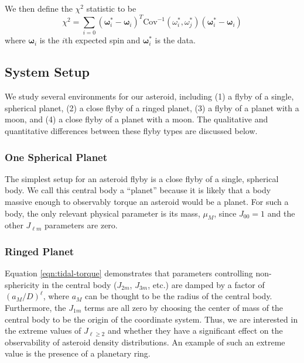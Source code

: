 \documentclass[11pt]{article}
\begin{document}
We then define the $\chi^2$ statistic to be
\begin{equation}
\chi^2 = \sum_{i=0} (\bm \omega_i^* - \bm \omega_i)^T\text{Cov}^{-1}(\omega^*_i, \omega^*_j)(\bm \omega_i^* - \bm \omega_i)
\end{equation}
where $\bm \omega_i$ is the $i$th expected spin and $\bm \omega_i^*$ is the data.



\subsection{System Setup}
We study several environments for our asteroid, including (1) a flyby of a single, spherical planet, (2) a close flyby of a ringed planet, (3) a flyby of a planet with a moon, and (4) a close flyby of a planet with a moon. The qualitative and quantitative differences between these flyby types are discussed below.

\subsubsection{One Spherical Planet}
The simplest setup for an asteroid flyby is a close flyby of a single, spherical body. We call this central body a ``planet'' because it is likely that a body massive enough to observably torque an asteroid would be a planet. For such a body, the only relevant physical parameter is its mass, $\mu_M$, since $J_{00} = 1$ and the other $J_{\ell m}$ parameters are zero.

\subsubsection{Ringed Planet}
Equation \ref{eqn:tidal-torque} demonstrates that parameters controlling non-sphericity in the central body ($J_{2m}$, $J_{3m}$, etc.) are damped by a factor of $(a_M/D)^\ell$, where $a_M$ can be thought to be the radius of the central body. Furthermore, the $J_{1m}$ terms are all zero by choosing the center of mass of the central body to be the origin of the coordinate system. Thus, we are interested in the extreme values of $J_{\ell \geq 2}$ and whether they have a significant effect on the observability of asteroid density distributions. An example of such an extreme value is the presence of a planetary ring.
\end{document}
